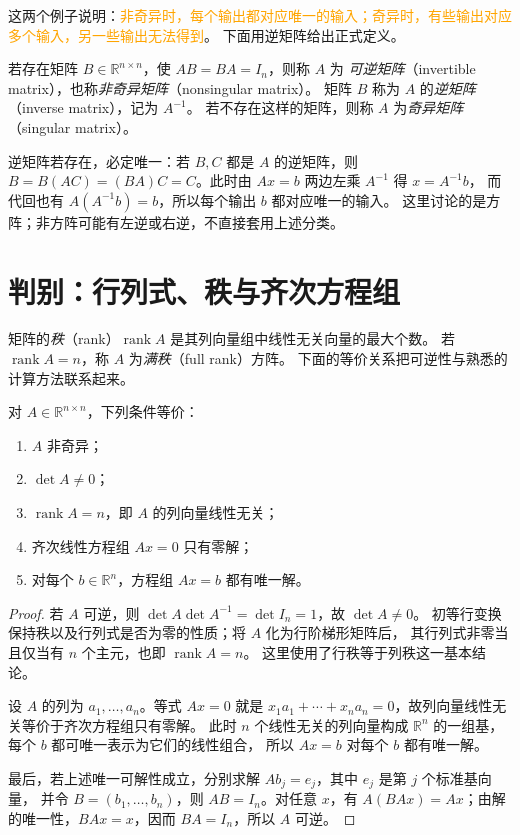 \documentclass[UTF8,12pt,a4paper,fontset=fandol]{ctexart}
\begin{document}
\begin{inputoutputbox}
这两个例子说明：\textcolor{orange}{非奇异时，每个输出都对应唯一的输入；奇异时，有些输出对应多个输入，另一些输出无法得到}。
下面用逆矩阵给出正式定义。
\end{inputoutputbox}

\begin{definition}[非奇异矩阵与奇异矩阵]
若存在矩阵 $B\in\mathbb R^{n\times n}$，使 $AB=BA=I_n$，则称 $A$ 为
\emph{可逆矩阵}（invertible matrix），也称\emph{非奇异矩阵}（nonsingular matrix）。
矩阵 $B$ 称为 $A$ 的\emph{逆矩阵}（inverse matrix），记为 $A^{-1}$。
若不存在这样的矩阵，则称 $A$ 为\emph{奇异矩阵}（singular matrix）。
\end{definition}

逆矩阵若存在，必定唯一：若 $B,C$ 都是 $A$ 的逆矩阵，则
$B=B(AC)=(BA)C=C$。此时由 $Ax=b$ 两边左乘 $A^{-1}$ 得 $x=A^{-1}b$，
而代回也有 $A(A^{-1}b)=b$，所以每个输出 $b$ 都对应唯一的输入。
这里讨论的是方阵；非方阵可能有左逆或右逆，不直接套用上述分类。

\section{判别：行列式、秩与齐次方程组}

矩阵的\emph{秩}（rank）$\operatorname{rank}A$ 是其列向量组中线性无关向量的最大个数。
若 $\operatorname{rank}A=n$，称 $A$ 为\emph{满秩}（full rank）方阵。
下面的等价关系把可逆性与熟悉的计算方法联系起来。

\begin{theorem}[非奇异矩阵的等价判别]
\label{thm:nonsingular-criteria}
对 $A\in\mathbb R^{n\times n}$，下列条件等价：
\begin{enumerate}
  \item $A$ 非奇异；
  \item $\det A\ne0$；
  \item $\operatorname{rank}A=n$，即 $A$ 的列向量线性无关；
  \item 齐次线性方程组 $Ax=0$ 只有零解；
  \item 对每个 $b\in\mathbb R^n$，方程组 $Ax=b$ 都有唯一解。
\end{enumerate}
\end{theorem}

\begin{proof}
若 $A$ 可逆，则 $\det A\det A^{-1}=\det I_n=1$，故 $\det A\ne0$。
初等行变换保持秩以及行列式是否为零的性质；将 $A$ 化为行阶梯形矩阵后，
其行列式非零当且仅当有 $n$ 个主元，也即 $\operatorname{rank}A=n$。
这里使用了行秩等于列秩这一基本结论。

设 $A$ 的列为 $a_1,\ldots,a_n$。等式 $Ax=0$ 就是
$x_1a_1+\cdots+x_na_n=0$，故列向量线性无关等价于齐次方程组只有零解。
此时 $n$ 个线性无关的列向量构成 $\mathbb R^n$ 的一组基，每个 $b$ 都可唯一表示为它们的线性组合，
所以 $Ax=b$ 对每个 $b$ 都有唯一解。

最后，若上述唯一可解性成立，分别求解 $Ab_j=e_j$，其中 $e_j$ 是第 $j$ 个标准基向量，
并令 $B=(b_1,\ldots,b_n)$，则 $AB=I_n$。对任意 $x$，有
$A(BAx)=Ax$；由解的唯一性，$BAx=x$，因而 $BA=I_n$，所以 $A$ 可逆。
\end{proof}
\end{document}
